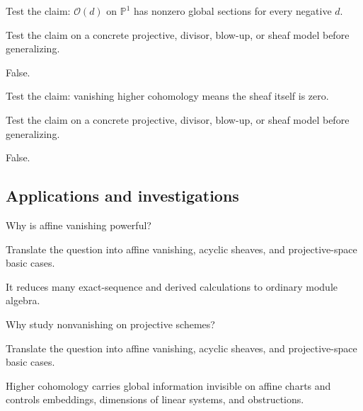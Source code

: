\begin{exercise}\label{exr:vi49-expand-11}
Test the claim: $\mathcal O(d)$ on $\mathbb P^1$ has nonzero global sections for every negative $d$.
\end{exercise}
\begin{hint}
Test the claim on a concrete projective, divisor, blow-up, or sheaf model before generalizing.
\end{hint}
\begin{solution}
False.
\end{solution}

\begin{exercise}\label{exr:vi49-expand-12}
Test the claim: vanishing higher cohomology means the sheaf itself is zero.
\end{exercise}
\begin{hint}
Test the claim on a concrete projective, divisor, blow-up, or sheaf model before generalizing.
\end{hint}
\begin{solution}
False.
\end{solution}

\subsection*{Applications and investigations}

\begin{exercise}\label{exr:vi49-expand-13}
Why is affine vanishing powerful?
\end{exercise}
\begin{hint}
Translate the question into affine vanishing, acyclic sheaves, and projective-space basic cases.
\end{hint}
\begin{solution}
It reduces many exact-sequence and derived calculations to ordinary module algebra.
\end{solution}

\begin{exercise}\label{exr:vi49-expand-14}
Why study nonvanishing on projective schemes?
\end{exercise}
\begin{hint}
Translate the question into affine vanishing, acyclic sheaves, and projective-space basic cases.
\end{hint}
\begin{solution}
Higher cohomology carries global information invisible on affine charts and controls embeddings, dimensions of linear systems, and obstructions.
\end{solution}

